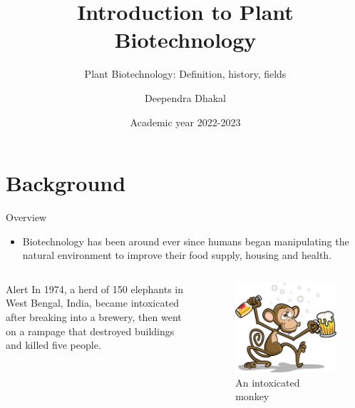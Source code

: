\documentclass[
  ignorenonframetext,
  aspectratio=169]{beamer}
\title{Introduction to Plant Biotechnology}
\subtitle{Plant Biotechnology: Definition, history, fields}
\author{Deependra Dhakal}
\date{Academic year 2022-2023}
\institute{CNRM, Tikapur \and AFU}
\providecommand{\tightlist}{%
  \setlength{\itemsep}{0pt}\setlength{\parskip}{0pt}}
\begin{document}
\frame{\titlepage}

\begin{frame}[allowframebreaks]
  \tableofcontents[hideallsubsections]
\end{frame}
\hypertarget{background}{%
\section{Background}\label{background}}

\begin{frame}{Overview}
\protect\hypertarget{overview}{}
\begin{itemize}
\tightlist
\item
  Biotechnology has been around ever since humans began manipulating the
  natural environment to improve their food supply, housing and health.
\end{itemize}

\begin{columns}[T,onlytextwidth]
  \scriptsize
  \begin{alertblock}{Alert}
  In 1974, a herd of 150 elephants in West Bengal, India, became intoxicated after breaking into a brewery, then went on a rampage that destroyed buildings and killed five people.
  \end{alertblock}

  
\begin{figure}
\includegraphics[width=0.35\linewidth]{../images/drunken_monkey} \caption{An intoxicated monkey}\label{fig:elephant-intoxication}
\end{figure}

\end{columns}

\end{frame}
\end{document}

